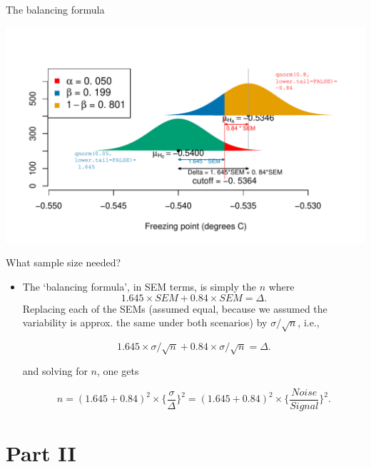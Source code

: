 \documentclass[10pt,handout]{beamer}\usepackage[]{graphicx}\usepackage[]{color}
\makeatletter
\def\maxwidth{ %
  \ifdim\Gin@nat@width>\linewidth
    \linewidth
  \else
    \Gin@nat@width
  \fi
}
\newenvironment{knitrout}{}{} %
\makeatother
\begin{document}
\begin{frame}[fragile]{The balancing formula}
\begin{knitrout}\tiny
{}\color{fgcolor}

{\centering \includegraphics[width=\maxwidth]{figure/unnamed-chunk-38-1} 

}


\end{knitrout}
\end{frame}


\begin{frame}{What sample size needed?}

\begin{itemize}
	\setlength\itemsep{1em}
	\item The `balancing formula', in SEM terms, is simply the $n$ where
	$$ 1.645 \times SEM + 0.84 \times SEM = \Delta.$$
	Replacing each of the  SEMs (assumed equal, because we assumed the variability
	is approx. the same under both scenarios) by $\sigma/\sqrt{n}$,  i.e.,
	
	$$ 1.645 \times \sigma/\sqrt{n} + 0.84 \times \sigma/\sqrt{n} = \Delta.$$
	
	and solving for $n$, one gets
	
	$$  n = (1.645 + 0.84)^2  \times \bigg\{ \frac{\sigma}{\Delta} \bigg\}^2 = 
	(1.645 + 0.84)^2  \times \bigg\{ \frac{Noise}{Signal} \bigg\}^2 .$$
\end{itemize}

\end{frame}



\section{Part II}
\end{document}
